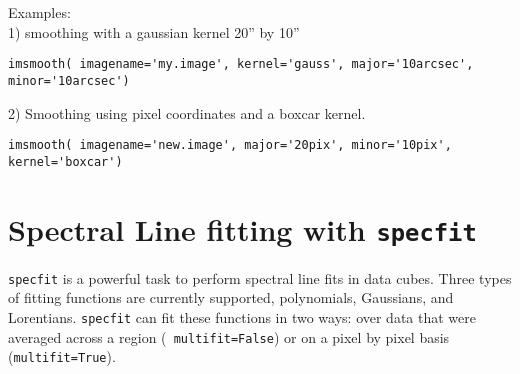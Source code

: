 Examples: \\

1) smoothing with a gaussian kernel 20'' by 10''
\begin{verbatim}
imsmooth( imagename='my.image', kernel='gauss', major='10arcsec', minor='10arcsec')
\end{verbatim}


2) Smoothing using pixel coordinates and a boxcar kernel.
\begin{verbatim}
imsmooth( imagename='new.image', major='20pix', minor='10pix', kernel='boxcar')
\end{verbatim}


\section{Spectral Line fitting with {\tt specfit}}
\label{section:analysis.specfit}

{\tt specfit} is a powerful task to perform spectral line fits in data
cubes. Three types of fitting functions are currently supported,
polynomials, Gaussians, and Lorentians. {\tt specfit} can fit these functions in
two ways: over data that were averaged across a region ({\tt
  multifit=False}) or on a pixel
by pixel basis ({\tt multifit=True}). 


